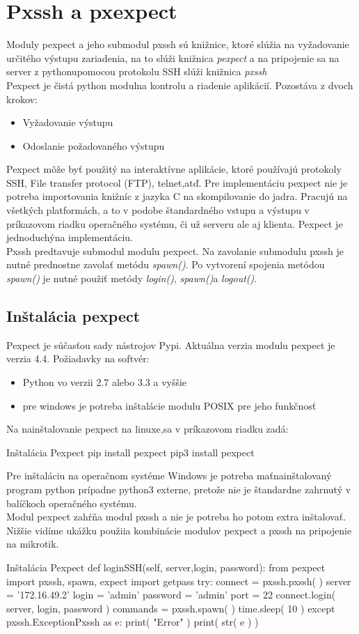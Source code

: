 \section{Pxssh a pxexpect}
Moduly pexpect\cite{pexpect} a jeho submodul pxssh\cite{pxssh} sú knižnice, ktoré slúžia na vyžadovanie určitého výstupu zariadenia, na to slúži knižnica \textit{pexpect} a na pripojenie sa na server z pythonupomocou protokolu SSH slúži knižnica \textit{pxssh}\\
Pexpect je čistá python modulna kontrolu a riadenie aplikácií. Pozostáva z dvoch krokov:\begin{itemize}
\item Vyžadovanie výstupu
\item Odoslanie požadovaného výstupu
\end{itemize} 
Pexpect môže byť použitý na interaktívne aplikácie, ktoré používajú protokoly SSH, File transfer protocol (FTP), telnet,atď. Pre implementáciu pexpect nie je potreba importovania knižníc z jazyka C na skompilovanie do jadra. Pracujú na všetkých platformách, a to v podobe štandardného vstupu a výstupu v príkazovom riadku operačného systému, či už serveru ale aj klienta. Pexpect je jednoduchýna implementáciu.\\
Pxssh predtavuje submodul modulu pexpect. Na zavolanie submodulu pxssh je nutné prednostne zavolať metódu \textit{spawn()}. Po vytvorení spojenia metódou \textit{spawn()} je nutné použiť metódy \textit{login()}, \textit{spawn()}a \textit{logout()}.
\subsection{Inštalácia pexpect}
Pexpect je súčasťou sady nástrojov Pypi. Aktuálna verzia modulu pexpect je verzia 4.4. Požiadavky na softvér:\begin{itemize}
\item Python vo verzii 2.7 alebo 3.3 a vyššie
\item pre windows je potreba inštalácie modulu POSIX pre jeho funkčnosť
\end{itemize}
Na nainštalovanie pexpect \cite{pexpectinstall} na linuxe,sa v príkazovom riadku zadá:
\begin{sexylisting}{Inštalácia Pexpect}
pip install pexpect
pip3 install pexpect
\end{sexylisting} 
Pre inštaláciu na operačnom systéme Windows je potreba maťnainštalovaný program python prípadne python3 externe, pretože nie je štandardne zahrnutý v balíčkoch operačného systému.\\
Modul pexpect zahŕňa modul pxssh a nie je potreba ho potom extra inštalovať.\\
Nižšie vidíme ukážku použiia kombinácie modulov pexpect a pxssh na pripojenie na mikrotik.
\begin{sexylisting}{Inštalácia Pexpect}
def loginSSH(self, server,login, password):
 from pexpect import pxssh, spawn, expect
 import getpass
 try:
  connect = pxssh.pxssh( )
  server = '172.16.49.2'
  login = 'admin'
  password = 'admin'
  port = 22
  connect.login( server, login, password )
  commands = pxssh.spawn( )
  time.sleep( 10 )
 except pxssh.ExceptionPxssh as e:
  print( "Error" )
  print( str( e ) )
\end{sexylisting}
